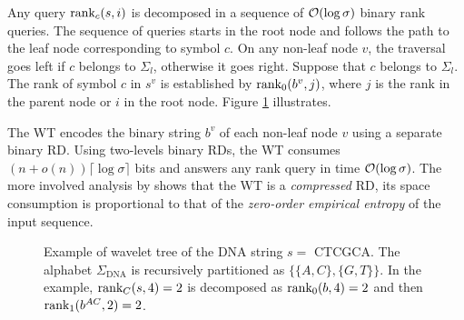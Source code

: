 
Any query $\text{rank}_c(s,i)$ is decomposed in a sequence of $\mathcal{O}(\log{\sigma})$ binary rank queries.
The sequence of queries starts in the root node and follows the path to the leaf node corresponding to symbol $c$.
On any non-leaf node $v$, the traversal goes left if $c$ belongs to $\Sigma_l$, otherwise it goes right.
Suppose \wlogs that $c$ belongs to $\Sigma_l$.
The rank of symbol $c$ in $s^v$ is established by $\text{rank}_0(b^v, j)$, where $j$ is the rank in the parent node or $i$ in the root node.
Figure \ref{fig:wt_dna} illustrates.

The WT encodes the binary string $b^v$ of each non-leaf node $v$ using a separate binary RD.
Using two-levels binary RDs, the WT consumes $(n + o(n)) \lceil \log \sigma \rceil$ bits and answers any rank query in time $\mathcal{O}(\log{\sigma})$.
The more involved analysis by \citep{Grossi2003} shows that the WT is a \emph{compressed} RD, \ie its space consumption is proportional to that of the \emph{zero-order empirical entropy} \citep{Manzini2001} of the input sequence.

\begin{figure}[h]
\begin{center}
\caption[Example of wavelet tree]{Example of wavelet tree of the DNA string $s=$ {\ttfamily CTCGCA}. The alphabet $\Sigma_{\text{DNA}}$ is recursively partitioned as $\{ \{A,C\}, \{G,T\} \}$. In the example, $\text{rank}_C(s,4)=2$ is decomposed as $\text{rank}_0(b,4) = 2$ and then $\text{rank}_1(b^{AC}, 2) = 2$.}
\label{fig:wt_dna}
\ttfamily

\end{center}
\end{figure}

